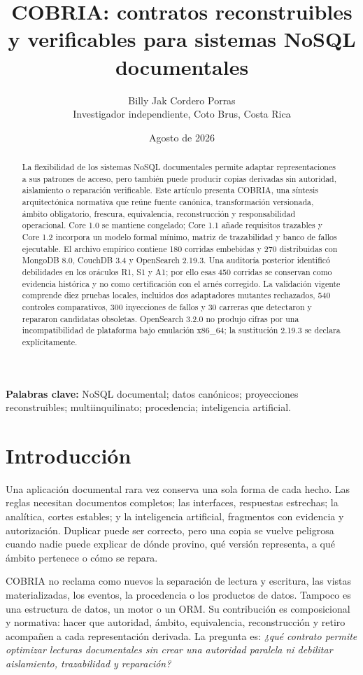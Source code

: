 \documentclass[11pt]{article}
\title{COBRIA: contratos reconstruibles y verificables para sistemas NoSQL documentales}
\author{Billy Jak Cordero Porras\\Investigador independiente, Coto Brus, Costa Rica}
\date{Agosto de 2026}
\begin{document}
\maketitle
\begin{abstract}
La flexibilidad de los sistemas NoSQL documentales permite adaptar representaciones a sus patrones de acceso, pero también puede producir copias derivadas sin autoridad, aislamiento o reparación verificable. Este artículo presenta COBRIA, una síntesis arquitectónica normativa que reúne fuente canónica, transformación versionada, ámbito obligatorio, frescura, equivalencia, reconstrucción y responsabilidad operacional. Core 1.0 se mantiene congelado; Core 1.1 añade requisitos trazables y Core 1.2 incorpora un modelo formal mínimo, matriz de trazabilidad y banco de fallos ejecutable. El archivo empírico contiene 180 corridas embebidas y 270 distribuidas con MongoDB 8.0, CouchDB 3.4 y OpenSearch 2.19.3. Una auditoría posterior identificó debilidades en los oráculos R1, S1 y A1; por ello esas 450 corridas se conservan como evidencia histórica y no como certificación con el arnés corregido. La validación vigente comprende diez pruebas locales, incluidos dos adaptadores mutantes rechazados, 540 controles comparativos, 300 inyecciones de fallos y 30 carreras que detectaron y repararon candidatas obsoletas. OpenSearch 3.2.0 no produjo cifras por una incompatibilidad de plataforma bajo emulación x86\_64; la sustitución 2.19.3 se declara explícitamente.
\end{abstract}
\textbf{Palabras clave:} NoSQL documental; datos canónicos; proyecciones reconstruibles; multiinquilinato; procedencia; inteligencia artificial.

\section{Introducción}
Una aplicación documental rara vez conserva una sola forma de cada hecho. Las reglas necesitan documentos completos; las interfaces, respuestas estrechas; la analítica, cortes estables; y la inteligencia artificial, fragmentos con evidencia y autorización. Duplicar puede ser correcto, pero una copia se vuelve peligrosa cuando nadie puede explicar de dónde provino, qué versión representa, a qué ámbito pertenece o cómo se repara.

COBRIA no reclama como nuevos la separación de lectura y escritura, las vistas materializadas, los eventos, la procedencia o los productos de datos. Tampoco es una estructura de datos, un motor o un ORM. Su contribución es composicional y normativa: hacer que autoridad, ámbito, equivalencia, reconstrucción y retiro acompañen a cada representación derivada. La pregunta es: \emph{¿qué contrato permite optimizar lecturas documentales sin crear una autoridad paralela ni debilitar aislamiento, trazabilidad y reparación?}
\end{document}
